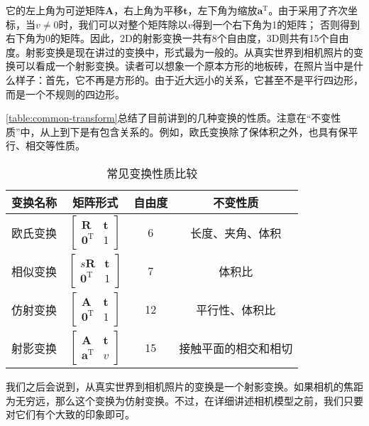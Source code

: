 \begin{enumerate}
	它的左上角为可逆矩阵$\bm{A}$，右上角为平移$\bm{t}$，左下角为缩放$\bm{a}^\mathrm{T}$。由于采用了齐次坐标，当$v \neq 0$时，我们可以对整个矩阵除以$v$得到一个右下角为1的矩阵； 否则得到右下角为$0$的矩阵。因此，2D的射影变换一共有8个自由度，3D则共有15个自由度。射影变换是现在讲过的变换中，形式最为一般的。从真实世界到相机照片的变换可以看成一个射影变换。读者可以想象一个原本方形的地板砖，在照片当中是什么样子：首先，它不再是方形的。由于近大远小的关系，它甚至不是平行四边形，而是一个不规则的四边形。
\end{enumerate}

\autoref{table:common-transform}总结了目前讲到的几种变换的性质。注意在“不变性质”中，从上到下是有包含关系的。例如，欧氏变换除了保体积之外，也具有保平行、相交等性质。

\begin{table}[!htp]
	\centering
	\caption{常见变换性质比较}
	\label{table:common-transform}
	\begin{tabu}{c|c|c|c}
		\toprule
		变换名称 & 矩阵形式 & 自由度 & 不变性质 \\ \midrule
		欧氏变换 \rule{0pt}{20 pt} & $\left[ {\begin{array}{*{20}{c}}
			\bm{R} & \bm{t}\\
			{{\bm{0}^\mathrm{T}}}&1
			\end{array}} \right]$ & 6 & 长度、夹角、体积 \\ 
		相似变换 \rule{0pt}{20 pt}& $ \left[ {\begin{array}{*{20}{c}}
			{s \bm{R}}& \bm{t}\\
			{{ \bm{0}^\mathrm{T}}}&1
			\end{array}} \right]$ & 7 & 体积比 \\ 
		仿射变换 \rule{0pt}{20 pt}& $ \left[ {\begin{array}{*{20}{c}}
			\bm{A} & \bm{t}\\
			{{\bm{0}^\mathrm{T}}} & 1
			\end{array}} \right]$   & 12 & 平行性、体积比 \\ 
		射影变换 \rule{0pt}{20 pt} & $ \left[ {\begin{array}{*{20}{c}}
			\bm{A} & \bm{t}\\
			{{\bm{a}^\mathrm{T}}} & v
			\end{array}} \right]$ & 15 & 接触平面的相交和相切 \rule{0pt}{20 pt}\\ 
		\bottomrule
	\end{tabu} 
\end{table}

我们之后会说到，从真实世界到相机照片的变换是一个射影变换。如果相机的焦距为无穷远，那么这个变换为仿射变换。不过，在详细讲述相机模型之前，我们只要对它们有个大致的印象即可。

